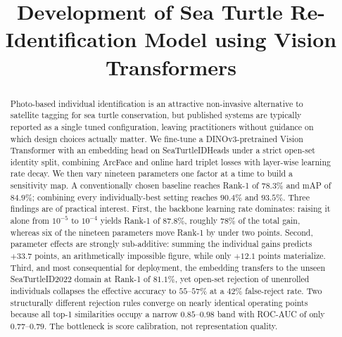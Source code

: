 \documentclass[conference]{IEEEtran}
\begin{document}
\title{Development of Sea Turtle Re-Identification Model using Vision Transformers}

\author{
  \and
  \and
}

\maketitle

\begin{abstract}
  Photo-based individual identification is an attractive non-invasive alternative to
  satellite tagging for sea turtle conservation, but published systems are typically
  reported as a single tuned configuration, leaving practitioners without guidance on
  which design choices actually matter. We fine-tune a DINOv3-pretrained Vision
  Transformer with an embedding head on SeaTurtleIDHeads under a strict open-set
  identity split, combining ArcFace and online hard triplet losses with layer-wise
  learning rate decay. We then vary nineteen parameters one factor at a time to build a
  sensitivity map. A conventionally chosen baseline reaches Rank-1 of $78.3\%$ and mAP of
  $84.9\%$; combining every individually-best setting reaches $90.4\%$ and $93.5\%$.
  Three findings are of practical interest. First, the backbone learning rate dominates:
  raising it alone from $10^{-5}$ to $10^{-4}$ yields Rank-1 of $87.8\%$, roughly $78\%$
  of the total gain, whereas six of the nineteen parameters move Rank-1 by under two
  points. Second, parameter effects are strongly sub-additive: summing the individual
  gains predicts $+33.7$ points, an arithmetically impossible figure, while only $+12.1$
  points materialize. Third, and most consequential for deployment, the embedding
  transfers to the unseen SeaTurtleID2022 domain at Rank-1 of $81.1\%$, yet open-set
  rejection of unenrolled individuals collapses the effective accuracy to
  $55$--$57\%$ at a $42\%$ false-reject rate. Two structurally different rejection rules
  converge on nearly identical operating points because all top-1 similarities occupy a
  narrow $0.85$--$0.98$ band with ROC-AUC of only $0.77$--$0.79$. The bottleneck is score
  calibration, not representation quality.
\end{abstract}
\end{document}
